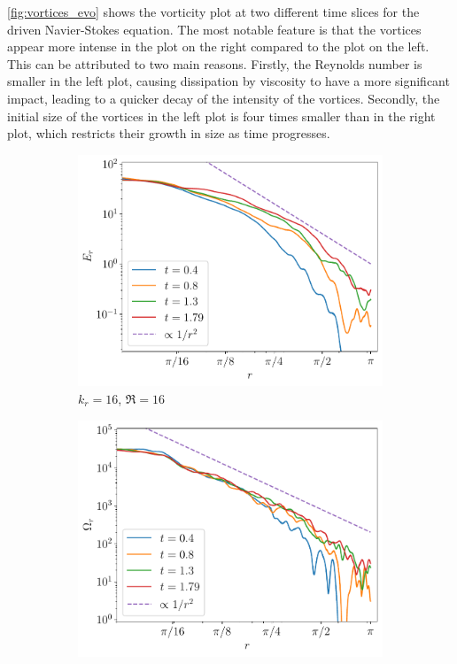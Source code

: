 \documentclass[../main.tex]{subfiles}
\begin{document}
\cref{fig:vortices_evo} shows the vorticity plot at two different time slices for the driven Navier-Stokes equation. The most notable feature is that the vortices appear more intense in the plot on the right compared to the plot on the left. This can be attributed to two main reasons. Firstly, the Reynolds number is smaller in the left plot, causing dissipation by viscosity to have a more significant impact, leading to a quicker decay of the intensity of the vortices. Secondly, the initial size of the vortices in the left plot is four times smaller than in the right plot, which restricts their growth in size as time progresses.
\begin{figure}[!ht]
	\centering
	\begin{subfigure}{0.44\textwidth}
		\centering
		\includegraphics[width=\textwidth]{images/Energy_t.kdn16.test6.pdf}
		\caption{$k_r = 16$, $\Re = 16$}
	\end{subfigure}\hspace{0.04\textwidth}
	\begin{subfigure}{0.44\textwidth}
		\centering
		\includegraphics[width=\textwidth]{images/Enstrophy_t.kdn16.test6.pdf}

\end{subfigure}
\end{figure}
\end{document}

